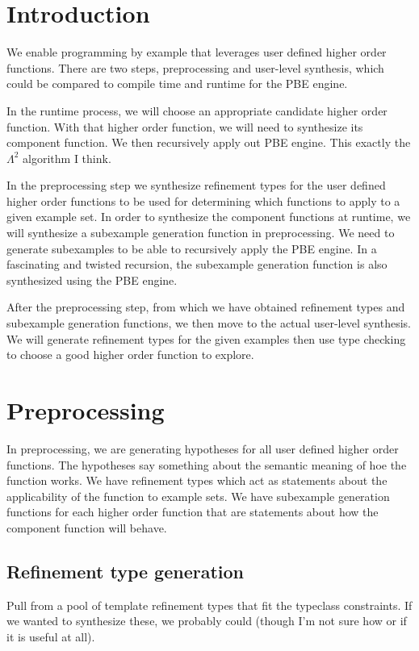 \section{Introduction}
We enable programming by example that leverages user defined higher order functions.
There are two steps, preprocessing and user-level synthesis, which could be compared to compile time and runtime for the PBE engine.

In the runtime process, we will choose an appropriate candidate higher order function.
With that higher order function, we will need to synthesize its component function.
We then recursively apply out PBE engine.
This exactly the $\Lambda^2$ algorithm I think.

In the preprocessing step we synthesize refinement types for the user defined higher order functions to be used for determining which functions to apply to a given example set.
In order to synthesize the component functions at runtime, we will synthesize a subexample generation function in preprocessing.
We need to generate subexamples to be able to recursively apply the PBE engine.
In a fascinating and twisted recursion, the subexample generation function is also synthesized using the PBE engine. 

After the preprocessing step, from which we have obtained refinement types and subexample generation functions, we then move to the actual user-level synthesis.
We will generate refinement types for the given examples then use type checking to choose a good higher order function to explore.

\section{Preprocessing}
In preprocessing, we are generating hypotheses for all user defined higher order functions.
The hypotheses say something about the semantic meaning of hoe the function works.
We have refinement types which act as statements about the applicability of the function to example sets.
We have subexample generation functions for each higher order function that are statements about how the component function will behave.

\subsection{Refinement type generation}
Pull from a pool of template refinement types that fit the typeclass constraints. 
If we wanted to synthesize these, we probably could (though I'm not sure how or if it is useful at all).

